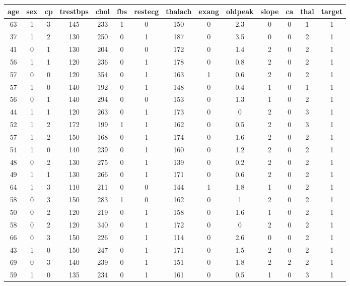 \documentclass{article}
\begin{document}
\begin{longtable}{|c|c|c|c|c|c|c|c|c|c|c|c|c|c|}
\hline
age & sex & cp & trestbps & chol & fbs & restecg & thalach & exang & oldpeak & slope & ca & thal & target\\
\hline
\endfirsthead
\hline
63 & 1 & 3 & 145 & 233 & 1 & 0 & 150 & 0 & 2.3 & 0 & 0 & 1 & 1\\
\hline
37 & 1 & 2 & 130 & 250 & 0 & 1 & 187 & 0 & 3.5 & 0 & 0 & 2 & 1\\
\hline
41 & 0 & 1 & 130 & 204 & 0 & 0 & 172 & 0 & 1.4 & 2 & 0 & 2 & 1\\
\hline
56 & 1 & 1 & 120 & 236 & 0 & 1 & 178 & 0 & 0.8 & 2 & 0 & 2 & 1\\
\hline
57 & 0 & 0 & 120 & 354 & 0 & 1 & 163 & 1 & 0.6 & 2 & 0 & 2 & 1\\
\hline
57 & 1 & 0 & 140 & 192 & 0 & 1 & 148 & 0 & 0.4 & 1 & 0 & 1 & 1\\
\hline
56 & 0 & 1 & 140 & 294 & 0 & 0 & 153 & 0 & 1.3 & 1 & 0 & 2 & 1\\
\hline
44 & 1 & 1 & 120 & 263 & 0 & 1 & 173 & 0 & 0 & 2 & 0 & 3 & 1\\
\hline
52 & 1 & 2 & 172 & 199 & 1 & 1 & 162 & 0 & 0.5 & 2 & 0 & 3 & 1\\
\hline
57 & 1 & 2 & 150 & 168 & 0 & 1 & 174 & 0 & 1.6 & 2 & 0 & 2 & 1\\
\hline
54 & 1 & 0 & 140 & 239 & 0 & 1 & 160 & 0 & 1.2 & 2 & 0 & 2 & 1\\
\hline
48 & 0 & 2 & 130 & 275 & 0 & 1 & 139 & 0 & 0.2 & 2 & 0 & 2 & 1\\
\hline
49 & 1 & 1 & 130 & 266 & 0 & 1 & 171 & 0 & 0.6 & 2 & 0 & 2 & 1\\
\hline
64 & 1 & 3 & 110 & 211 & 0 & 0 & 144 & 1 & 1.8 & 1 & 0 & 2 & 1\\
\hline
58 & 0 & 3 & 150 & 283 & 1 & 0 & 162 & 0 & 1 & 2 & 0 & 2 & 1\\
\hline
50 & 0 & 2 & 120 & 219 & 0 & 1 & 158 & 0 & 1.6 & 1 & 0 & 2 & 1\\
\hline
58 & 0 & 2 & 120 & 340 & 0 & 1 & 172 & 0 & 0 & 2 & 0 & 2 & 1\\
\hline
66 & 0 & 3 & 150 & 226 & 0 & 1 & 114 & 0 & 2.6 & 0 & 0 & 2 & 1\\
\hline
43 & 1 & 0 & 150 & 247 & 0 & 1 & 171 & 0 & 1.5 & 2 & 0 & 2 & 1\\
\hline
69 & 0 & 3 & 140 & 239 & 0 & 1 & 151 & 0 & 1.8 & 2 & 2 & 2 & 1\\
\hline
59 & 1 & 0 & 135 & 234 & 0 & 1 & 161 & 0 & 0.5 & 1 & 0 & 3 & 1\\

\end{longtable}
\end{document}
